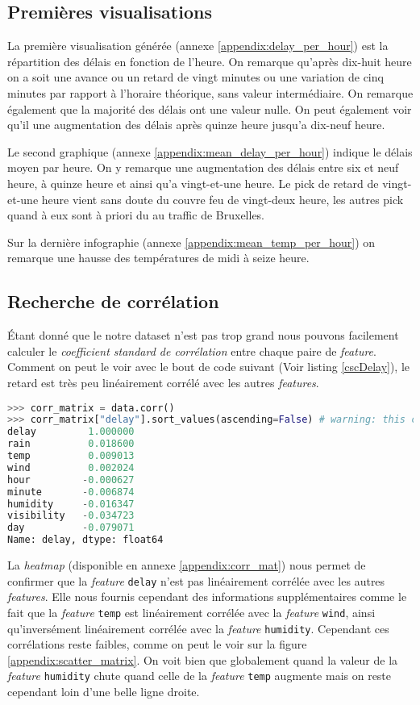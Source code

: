 \subsection{Premières visualisations}
La première visualisation générée (annexe \ref{appendix:delay_per_hour}) est la répartition des délais en fonction de l'heure. On remarque qu'après dix-huit heure on a soit une avance ou un retard de vingt minutes ou une variation de cinq minutes par rapport à l'horaire théorique, sans valeur intermédiaire. On remarque également que la majorité des délais ont une valeur nulle. On peut également voir qu'il une augmentation des délais après quinze heure jusqu'a dix-neuf heure.

Le second graphique (annexe \ref{appendix:mean_delay_per_hour}) indique le délais moyen par heure. On y remarque une augmentation des délais entre six et neuf heure, à quinze heure et ainsi qu'a vingt-et-une heure. Le pick de retard de vingt-et-une heure vient sans doute du couvre feu de vingt-deux heure, les autres pick quand à eux sont à priori du au traffic de Bruxelles.

Sur la dernière infographie (annexe \ref{appendix:mean_temp_per_hour}) on remarque une hausse des températures de midi à seize heure.

\subsection{Recherche de corrélation}
Étant donné que le notre dataset n'est pas trop grand nous pouvons facilement calculer le \textit{coefficient standard de corrélation} entre chaque paire de \textit{feature}. Comment on peut le voir avec le bout de code suivant (Voir listing \ref{cscDelay}), le retard est très peu linéairement corrélé avec les autres \textit{features}.

\begin{lstlisting}[language=Python, caption=Coefficient standard de corrélation pour la \textit{feature} \lstinline!delay!., label=cscDelay]
>>> corr_matrix = data.corr()
>>> corr_matrix["delay"].sort_values(ascending=False) # warning: this check only linear correlation
delay         1.000000
rain          0.018600
temp          0.009013
wind          0.002024
hour         -0.000627
minute       -0.006874
humidity     -0.016347
visibility   -0.034723
day          -0.079071
Name: delay, dtype: float64
\end{lstlisting}

La \textit{heatmap} (disponible en annexe \ref{appendix:corr_mat}) nous permet de confirmer que la \textit{feature} \lstinline!delay! n'est pas linéairement corrélée avec les autres \textit{features}. Elle nous fournis cependant des informations supplémentaires comme le fait que la \textit{feature} \lstinline!temp! est linéairement corrélée avec la \textit{feature} \lstinline!wind!, ainsi qu'inversément linéairement corrélée avec la \textit{feature} \lstinline!humidity!. Cependant ces corrélations reste faibles, comme on peut le voir sur la figure \ref{appendix:scatter_matrix}. On voit bien que globalement quand la valeur de la \textit{feature} \lstinline!humidity! chute quand celle de la \textit{feature} \lstinline!temp! augmente mais on reste cependant loin d'une belle ligne droite.

